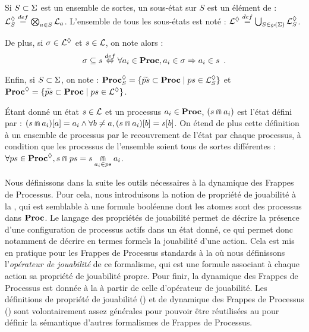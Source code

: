 \begin{definition}
  Si $S \subset \PHs$ est un ensemble de sortes, un sous-état sur $S$ est un élément de :
  $\PHsubl[\PHl]_S \DEF \bigtimes{a \in S} \PHl_a$.
  L'ensemble de tous les sous-états est noté :
  $\PHsubl[\PHl] \DEF \bigcup_{S \in\powerset(\PHs)} \PHsubl[\PHl]_S$.
  
  \noindent
  De plus, si $\mysigma \in \PHsubl[\PHl]$ et $s \in \PHl$, on note alors :
  \[\mysigma \subseteq s \EQDEF \forall a_i \in \Proc, a_i \in \mysigma \Rightarrow a_i \in s
    \enspace.\]
  
  \noindent
  Enfin, si $S \subset \PHs$, on note :
  $\PHsublset_S = \{ \toset{ps} \subset \Proc \mid ps \in \PHsubl_S \}$
  et
  $\PHsublset = \{ \toset{ps} \subset \Proc \mid ps \in \PHsubl \}$.
\end{definition}
%
\begin{definition}
  Étant donné un état $s \in \PHl$ et un processus $a_i \in \PHproc$,
  $(s \recouvre a_i)$ est l'état défini par :
  $\PHget{(s \recouvre a_i)}{a} = a_i \wedge
    \forall b \neq a, \PHget{(s \recouvre a_i)}{b} = \PHget{s}{b}$.
  On étend de plus cette définition à un ensemble de processus
  par le recouvrement de l'état par chaque processus,
  à condition que les processus de l'ensemble soient tous de sortes différentes :
  $\forall ps \in \PHsublset, s \recouvre ps = s \underset{a_i \in ps}{\recouvre} a_i$.
\end{definition}

Nous définissons dans la suite les outils nécessaires à la dynamique des Frappes de Processus.
Pour cela, nous introduisons la notion de propriété de jouabilité à la ,
qui est semblable à une formule booléenne dont les atomes sont des processus dans $\Proc$.
Le langage des propriétés de jouabilité permet de décrire la présence d'une configuration
de processus actifs dans un état donné, ce qui
permet donc notamment de décrire en termes formels la jouabilité d'une action.
Cela est mis en pratique pour les Frappes de Processus standards à la 
où nous définissons l'\emph{opérateur de jouabilité} de ce formalisme,
qui est une formule associant à chaque action sa propriété de jouabilité propre.
Pour finir, la dynamique des Frappes de Processus est donnée à la 
à partir de celle d'opérateur de jouabilité.
Les définitions de propriété de jouabilité () et de dynamique des Frappes de Processus
() sont volontairement assez générales pour pouvoir être réutilisées au
 pour définir la sémantique d'autres formalismes de Frappes de Processus.

